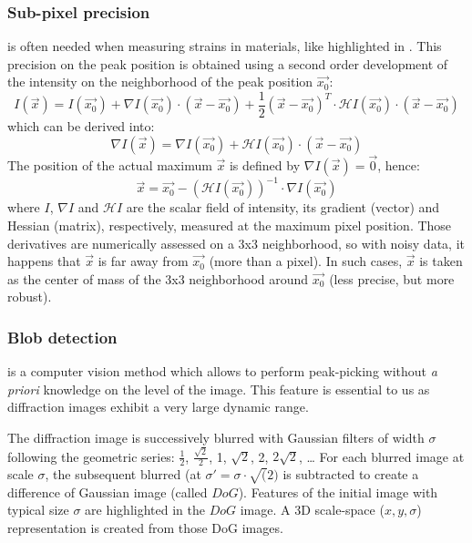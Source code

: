 \documentclass[preprint]{iucr}
\begin{document}
\subsubsection{Sub-pixel precision} 
\label{subpixel}
is often needed when measuring strains in materials, like highlighted in 
\cite{to5079}.
This precision on the peak position is obtained using a second order
development of the intensity on the neighborhood of the peak position $\overrightarrow{x_0}$:
$$ I(\overrightarrow{x}) = I(\overrightarrow{x_0}) + \nabla
I(\overrightarrow{x_0})\cdot (\overrightarrow{x}-\overrightarrow{x_0}) +
\frac{1}{2} (\overrightarrow{x}-\overrightarrow{x_0})^T\cdot\mathcal{H}
I(\overrightarrow{x_0})\cdot(\overrightarrow{x}-\overrightarrow{x_0})$$ which
can be derived into:
$$\nabla I(\overrightarrow{x}) =\nabla I(\overrightarrow{x_0}) +
\mathcal{H}I(\overrightarrow{x_0})\cdot(\overrightarrow{x}-\overrightarrow{x_0})$$
The position of the actual maximum $\overrightarrow{x}$ is defined by
$\nabla I(\overrightarrow{x})=\overrightarrow{0}$, hence:
$$\overrightarrow{x} = \overrightarrow{x_0} - (\mathcal{H}
I(\overrightarrow{x_0}))^{-1}\cdot\nabla I(\overrightarrow{x_0})$$ where $I$,
$\nabla I$ and $\mathcal{H} I$ are the scalar field of intensity, its gradient
(vector) and Hessian (matrix), respectively, measured at the maximum pixel position.
Those derivatives are numerically assessed on a 3x3 neighborhood, so with noisy
data, it happens that $\overrightarrow{x}$ is far away from
$\overrightarrow{x_0}$ (more than a pixel). In such cases, $\overrightarrow{x}$
is taken as the center of mass of the 3x3 neighborhood around
$\overrightarrow{x_0}$ (less precise, but more robust).

\subsubsection{Blob detection}
\label{blob}
is a computer vision method which allows to perform peak-picking without
\textit{a priori} knowledge on the level of the image.
This feature is essential to us as diffraction images exhibit a very large
dynamic range.

The diffraction image is successively blurred with Gaussian filters of
width $\sigma$ following the geometric series: $\frac{1}{2}$,
$\frac{\sqrt{2}}{2}$, 1, $\sqrt{2}$, 2, $2\sqrt{2}$, \ldots
For each blurred image at scale $\sigma$, the subsequent blurred (at
$\sigma'=\sigma\cdot\sqrt(2)$
is subtracted to create a difference of Gaussian
image (called $DoG$). 
Features of the initial image with typical size $\sigma$ are highlighted in
the $DoG$ image.
A 3D scale-space ($x,y,\sigma$) representation is created from those DoG images.
\end{document}

